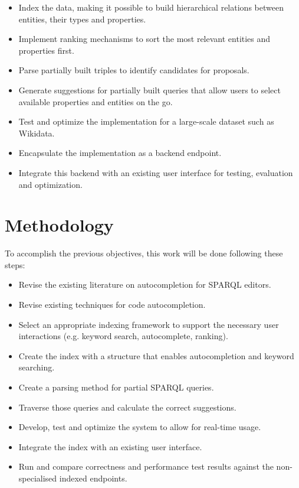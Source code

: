 \begin{itemize}
    \item Index the data, making it possible to build hierarchical relations between entities, their types and properties.
    \item Implement ranking mechanisms to sort the most relevant entities and properties first.
    \item Parse partially built triples to identify candidates for proposals.
    \item Generate suggestions for partially built queries that allow users to select available properties and entities on the go.
    \item Test and optimize the implementation for a large-scale dataset such as Wikidata.
    \item Encapsulate the implementation as a backend endpoint.
    \item Integrate this backend with an existing user interface for testing, evaluation and optimization.
\end{itemize}

\section{Methodology}

To accomplish the previous objectives, this work will be done following these steps:

\begin{itemize}
    \item Revise the existing literature on autocompletion for SPARQL editors.
    \item Revise existing techniques for code autocompletion.
    \item Select an appropriate indexing framework to support the necessary user interactions (e.g. keyword search, autocomplete, ranking).
    \item Create the index with a structure that enables autocompletion and keyword searching.
    \item Create a parsing method for partial SPARQL queries.
    \item Traverse those queries and calculate the correct suggestions.
    \item Develop, test and optimize the system to allow for real-time usage.
    \item Integrate the index with an existing user interface.
    \item Run and compare correctness and performance test results against the non-specialised indexed endpoints.
\end{itemize}

